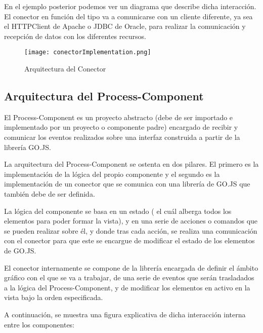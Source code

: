 En el ejemplo posterior podemos ver un diagrama que describe dicha interacción. El conector en función del tipo va a comunicarse con un cliente diferente, ya sea el HTTPClient \cite{httpclient} de Apache o JDBC \cite{jdbc} de Oracle, para realizar la comunicación y recepción de datos con los diferentes recursos.

\begin{figure}[H]
	\centering
	\texttt{[image: conectorImplementation.png]}
	\caption{Arquitectura del Conector}\label{fig:conectorImplementation}
\end{figure}


\subsection{Arquitectura del Process-Component}

El Process-Component es un proyecto abstracto (debe de ser importado e implementado por un proyecto o componente padre) encargado de recibir y comunicar los eventos realizados sobre una interfaz construida a partir de la librería GO.JS.

La arquitectura del Process-Component se ostenta en dos pilares. El primero es la implementación de la lógica del propio componente y el segundo es la implementación de un conector que se comunica con una librería de GO.JS que también debe de ser definida.

La lógica del componente se basa en un estado ( el cuál alberga todos los elementos para poder formar la vista), y en una serie de acciones o comandos que se pueden realizar sobre él, y donde tras cada acción, se realiza una comunicación con el conector para que este se encargue de modificar el estado de los elementos de GO.JS.

El conector internamente se compone de la librería encargada de definir el ámbito gráfico con el que se va a trabajar, de una serie de eventos que serán trasladados a la lógica del Process-Component, y de modificar los elementos en activo en la vista bajo la orden especificada.

A continuación, se muestra una figura explicativa de dicha interacción interna entre los componentes:

